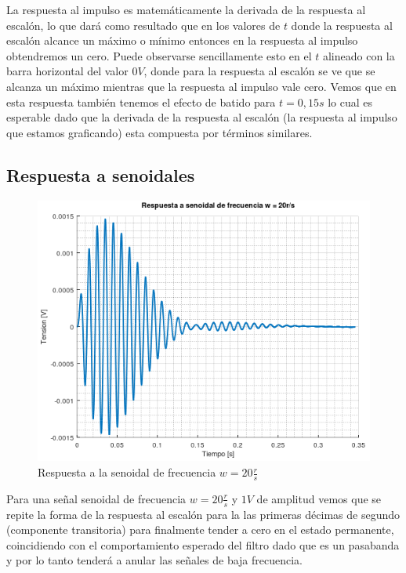 \documentclass[11pt,a4paper]{report}
\begin{document}
La respuesta al impulso es matemáticamente la derivada de la respuesta al escalón,
lo que dará como resultado que en los valores de $t$ donde la respuesta al escalón
alcance un máximo o mínimo entonces en la respuesta al impulso obtendremos un cero.
Puede observarse sencillamente esto en el $t$ alineado con la barra horizontal 
del valor $0 V$, donde para la respuesta al escalón se ve que se alcanza un máximo
mientras que la respuesta al impulso vale cero. Vemos que en esta respuesta también
tenemos el efecto de batido para $t = 0,15s$ lo cual es esperable dado que la derivada de la respuesta al escalón (la respuesta al impulso que estamos graficando) esta compuesta por términos similares.


\newpage
\subsection*{Respuesta a senoidales}

\begin{figure}[h!]
\includegraphics[scale=0.96]{RtaSenoidalBajo.png}
\caption{Respuesta a la senoidal de frecuencia $w = 20\frac{r}{s}$}
\end{figure}

Para una señal senoidal de frecuencia $w = 20\frac{r}{s}$ y $1V$ de amplitud vemos que se repite la forma de la respuesta al escalón para la las primeras décimas de segundo (componente transitoria) para finalmente tender a cero en el estado permanente, coincidiendo con el comportamiento esperado del filtro dado que es un pasabanda y por lo tanto tenderá a anular las señales de baja frecuencia.
\end{document}
